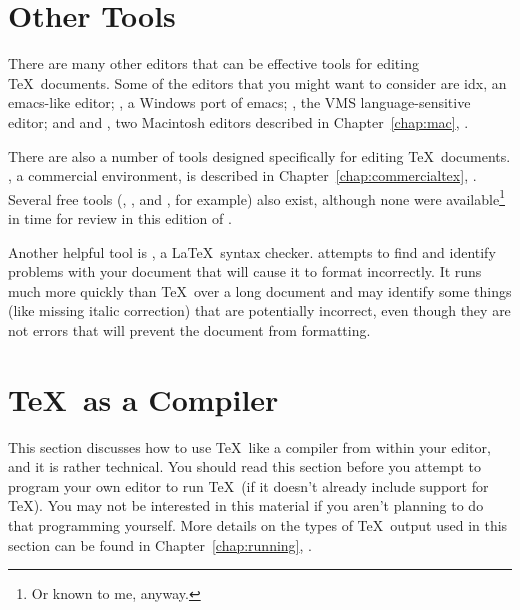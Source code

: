 \section{Other Tools}

There are many other editors that can be effective tools for editing
\TeX\ documents.  Some of the editors that you might want to consider
are idx{}, an emacs-like editor; , 
a Windows port
of emacs; , the VMS language-sensitive editor; 
and  and , two Macintosh editors described
in Chapter~\ref{chap:mac}, \textit{}.

There are also a number of tools designed specifically for editing 
\TeX\ documents.
, a commercial environment, is described in
Chapter~\ref{chap:commercialtex}, \textit{}.
Several free tools (,
, and , for example) also exist,
although none
were available\footnote{Or known to me, anyway.} in time for review
in this edition of \textit{\booktitle}.

Another helpful tool is , a \LaTeX\ syntax checker.
 attempts to find and identify problems with your document
that will cause it to format incorrectly.  It runs much more quickly than
\TeX\ over a long document and may identify some things (like 
\newpage
missing
italic correction) that are potentially incorrect, even though they are
not errors that will prevent the document from formatting.

\section{\protect\TeX\ as a Compiler}
\label{sec:texcomp}

This section discusses how to use \TeX\ like 
a compiler from within
your editor, and it is rather technical.  You should read this section
before you attempt to program your own editor to run \TeX\ (if it
doesn't already include support for \TeX).  You may
not be interested in this material if you aren't planning to do that
programming yourself.
More details on the types of \TeX\ output used in this section can be
found in Chapter~\ref{chap:running}, {\it {}}.

